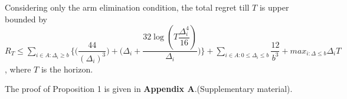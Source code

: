 


\begin{proposition}
Considering only the arm elimination condition, the total regret till $T$ is upper bounded by $R_{T}\leq \sum_{i\in A:\Delta_{i}\geq b}\bigg \lbrace \bigg(\dfrac{44}{(\Delta_{i})^{3}}\bigg) + \bigg(\Delta_{i}+\dfrac{32\log{(T\dfrac{\Delta_{i}^{4}}{16})}}{\Delta_{i}}\bigg)\bigg\rbrace + \sum_{i\in A:0\leq\Delta_{i}\leq b}\dfrac{12}{b^{3}} + max_{i:\Delta\leq b}\Delta_{i}T$, where $T$ is the horizon.
\end{proposition}

	The proof of Proposition 1 is given in \textbf{Appendix A}.(Supplementary material).

